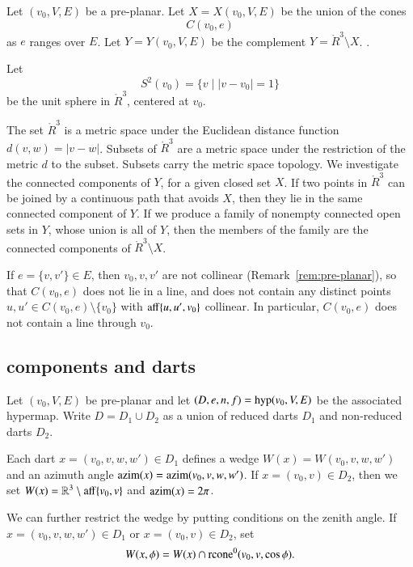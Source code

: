 \begin{definition}\label{def:XY}
Let $(v_0,V,E)$ be a pre-planar.  Let $X=X(v_0,V,E)$ be the union of the
cones
   $$C(v_0,e)$$
as $e$ ranges over $E$.  Let $Y=Y(v_0,V,E)$ be the complement
$Y = \ring{R}^3\setminus X$.
.
\end{definition}


Let $$S^2(v_0) = \{ v \mid | v-v_0 | = 1\}$$ be the unit sphere in
$\ring{R}^3$, centered at $v_0$.  

The set $\ring{R}^3$ is a metric space under the
Euclidean distance function $d(v,w) = |v-w|$.  Subsets of
$\ring{R}^3$ are a metric space under the restriction of the metric
$d$ to the subset. Subsets carry the metric space topology.  We
investigate the connected components of $Y$,
for a given closed set $X$.    If two
points in $\ring{R}^3$ 
can be joined by a continuous path that avoids $X$,
then they lie in the same connected component of $Y$.
If we produce a family of nonempty connected open sets in
$Y$, whose union is all of $Y$, then the
members of the family are the connected components of $\ring{R}^3\setminus
X$.






If $e=\{v,v'\}\in E$, then $v_0,v,v'$ are not collinear
(Remark~\ref{rem:pre-planar}), so that $C(v_0,e)$
does not lie in a line, and does not contain any
distinct points $u,u'\in
C(v_0,e)\setminus\{v_0\}$ 
with ${\operatorname{aff}}\{u,u',v_0\}$ collinear. 
In particular, $C(v_0,e)$ does not contain a line through $v_0$.



\subsection{components and darts}

Let $(v_0,V,E)$ be pre-planar and let $(D,e,n,f) = {\operatorname{hyp}}(v_0,V,E)$
be the associated hypermap.  Write $D = D_1\cup D_2$ as a union of
reduced darts $D_1$ and non-reduced darts $D_2$.

Each dart $x=(v_0,v,w,w')\in D_1$ defines
a wedge $W(x) = W(v_0,v,w,w')$ and an azimuth angle ${\operatorname{azim}}(x) =
{\operatorname{azim}}(v_0,v,w,w')$.   If $x=(v_0,v)\in D_2$, then we set
$W(x) = \mathbb{R}^3\setminus {\operatorname{aff}}\{v_0,v\}$ and ${\operatorname{azim}}(x) = 2\pi$.

We can further restrict the wedge by putting conditions on the zenith angle.
If $x = (v_0,v,w,w')\in D_1$ or $x = (v_0,v)\in D_2$, set
    $$
    W(x,\phi) = W(x) \cap {\operatorname{rcone}}^0(v_0,v,\cos\phi).
    $$


